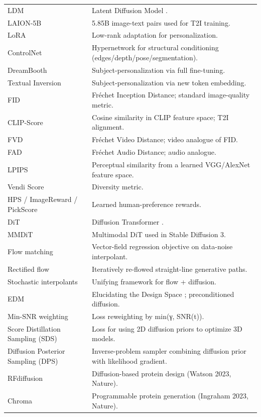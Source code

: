 \documentclass{article}
\begin{document}
\begin{table}[t]
\begin{tabular}{>{\raggedright\arraybackslash}p{0.3333\linewidth}
  >{\raggedright\arraybackslash}p{0.6667\linewidth}}
LDM & Latent Diffusion Model \citep{rombach2022highresolutionimag}. \\
LAION-5B & 5.85B image-text pairs used for T2I training. \\
LoRA & Low-rank adaptation for personalization. \\
ControlNet & Hypernetwork for structural conditioning (edges/depth/pose/segmentation). \\
DreamBooth & Subject-personalization via full fine-tuning. \\
Textual Inversion & Subject-personalization via new token embedding. \\
FID & Fréchet Inception Distance; standard image-quality metric. \\
CLIP-Score & Cosine similarity in CLIP feature space; T2I alignment. \\
FVD & Fréchet Video Distance; video analogue of FID. \\
FAD & Fréchet Audio Distance; audio analogue. \\
LPIPS & Perceptual similarity from a learned VGG/AlexNet feature space. \\
Vendi Score & Diversity metric. \\
HPS / ImageReward / PickScore & Learned human-preference rewards. \\
DiT & Diffusion Transformer \citep{peebles2023scalablediffusionm}. \\
MMDiT & Multimodal DiT used in Stable Diffusion 3. \\
Flow matching & Vector-field regression objective on data-noise interpolant. \\
Rectified flow & Iteratively re-flowed straight-line generative paths. \\
Stochastic interpolants & Unifying framework for flow + diffusion. \\
EDM & Elucidating the Design Space \citep{karras2022elucidatingthedesi}; preconditioned diffusion. \\
Min-SNR weighting & Loss reweighting by min(γ, SNR(t)). \\
Score Distillation Sampling (SDS) & Loss for using 2D diffusion priors to optimize 3D models. \\
Diffusion Posterior Sampling (DPS) & Inverse-problem sampler combining diffusion prior with likelihood gradient. \\
RFdiffusion & Diffusion-based protein design (Watson 2023, Nature). \\
Chroma & Programmable protein generation (Ingraham 2023, Nature). \\

\end{tabular}
\end{table}
\end{document}
